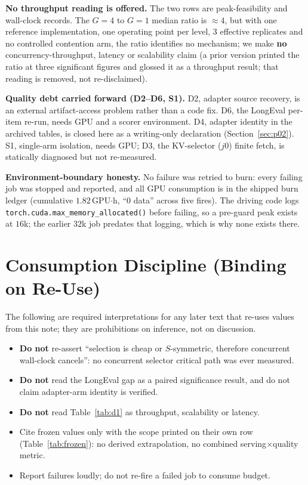 \documentclass{article}
\newcommand{\code}[1]{\texttt{#1}}
\begin{document}
\textbf{No throughput reading is offered.} The two rows are peak-feasibility and wall-clock
records. The $G{=}4$ to $G{=}1$ median ratio is $\approx 4$, but with one reference
implementation, one operating point per level, 3 effective replicates and no controlled
contention arm, the ratio identifies no mechanism; we make \textbf{no} concurrency-throughput,
latency or scalability claim (a prior version printed the ratio at three significant figures and
glossed it as a throughput result; that reading is removed, not re-disclaimed).

\textbf{Quality debt carried forward (D2--D6, S1).} D2, adapter source recovery, is an external
artifact-access problem rather than a code fix. D6, the LongEval per-item re-run, needs GPU and a
scorer environment. D4, adapter identity in the archived tables, is closed here as a writing-only
declaration (Section~\ref{sec:p02}). S1, single-arm isolation, needs GPU; D3, the KV-selector
($j0$) finite fetch, is statically diagnosed but not re-measured.

\textbf{Environment-boundary honesty.} No failure was retried to burn: every failing job was
stopped and reported, and all GPU consumption is in the shipped burn ledger (cumulative
$1.82$\,GPU$\cdot$h, ``0 data'' across five fires). The driving code logs
\code{torch.cuda.max\_memory\_allocated()} before failing, so a pre-guard peak exists at $16$k; the
earlier $32$k job predates that logging, which is why none exists there.

\section{Consumption Discipline (Binding on Re-Use)}\label{sec:discipline}
The following are required interpretations for any later text that re-uses values from this note;
they are prohibitions on inference, not on discussion.
\begin{itemize}\itemsep0pt\parskip0pt
  \item \textbf{Do not} re-assert ``selection is cheap or $S$-symmetric, therefore concurrent
        wall-clock cancels'': no concurrent selector critical path was ever measured.
  \item \textbf{Do not} read the LongEval gap as a paired significance result, and do not claim
        adapter-arm identity is verified.
  \item \textbf{Do not} read Table~\ref{tab:d1} as throughput, scalability or latency.
  \item Cite frozen values only with the scope printed on their own row
        (Table~\ref{tab:frozen}): no derived extrapolation, no combined
        serving$\times$quality metric.
  \item Report failures loudly; do not re-fire a failed job to consume budget.
\end{itemize}
\end{document}
